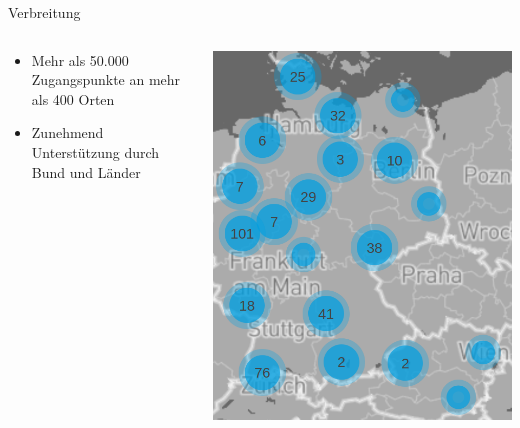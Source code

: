 \documentclass[t,aspectratio=169]{beamer}
\begin{document}
  \begin{frame}{Verbreitung}
    \vspace{-2em}
    \begin{columns}
      \begin{column}{0.6\textwidth}
        \begin{itemize}
          \item Mehr als 50.000 Zugangspunkte an mehr als 400 Orten
          \item Zunehmend Unterstützung durch Bund und Länder
        \end{itemize}
      \end{column}
      \begin{column}{0.4\textwidth}
        \begin{center}
          \includegraphics[height=0.8\textheight]{Bilder/community-map-2020-11-12}
        \end{center}
      \end{column}
    \end{columns}
  \end{frame}
  
\end{document}
